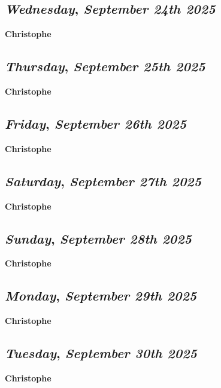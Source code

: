\def\day{\textit{September 24th 2025}}
\def\weekday{\textit{Wednesday}}
\subsection*{\weekday, \day}
\textbf {Christophe}

\def\day{\textit{September 25th 2025}}
\def\weekday{\textit{Thursday}}
\subsection*{\weekday, \day}
\textbf {Christophe}

\def\day{\textit{September 26th 2025}}
\def\weekday{\textit{Friday}}
\subsection*{\weekday, \day}
\textbf {Christophe}

\def\day{\textit{September 27th 2025}}
\def\weekday{\textit{Saturday}}
\subsection*{\weekday, \day}
\textbf {Christophe}

\def\day{\textit{September 28th 2025}}
\def\weekday{\textit{Sunday}}
\subsection*{\weekday, \day}
\textbf {Christophe}

\def\day{\textit{September 29th 2025}}
\def\weekday{\textit{Monday}}
\subsection*{\weekday, \day}
\textbf {Christophe}

\def\day{\textit{September 30th 2025}}
\def\weekday{\textit{Tuesday}}
\subsection*{\weekday, \day}
\textbf {Christophe}
